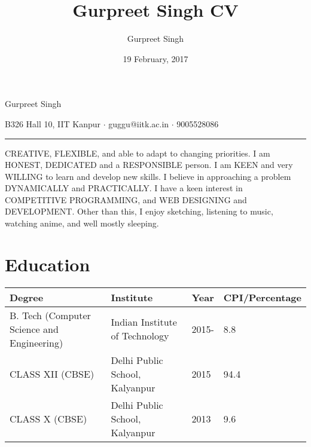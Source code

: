 \documentclass[a4paper, 10pt]{article}
\title{Gurpreet Singh CV}
\author{Gurpreet Singh}
\date{19 February, 2017}
\begin{document}

\begin{center}
    {\huge Gurpreet Singh} \\
    \vspace{5mm}
    
    B326 Hall 10, IIT Kanpur $ \cdot $ guggu@iitk.ac.in $ \cdot $ 9005528086

	\rule{\paperwidth}{0.4pt}

\end{center}

CREATIVE, FLEXIBLE, and able to adapt to changing priorities. I am HONEST, DEDICATED and a RESPONSIBLE person. I am KEEN and very WILLING to learn and develop new skills. I believe in approaching a problem DYNAMICALLY and PRACTICALLY. I have a keen interest in COMPETITIVE PROGRAMMING, and WEB DESIGNING and DEVELOPMENT. Other than this, I enjoy sketching, listening to music, watching anime, and well mostly sleeping.

\section*{Education}

	\begin{center}
	
		{\renewcommand{\arraystretch}{1.4}
		
		\begin{tabular}{ p{5cm}|p{5cm}|p{2cm}|p{3.5cm} }
		
		\hline
		\textbf{Degree} & \textbf{Institute} & \textbf{Year} & \textbf{CPI/Percentage} \\
		
		\hline
		B. Tech \newline (Computer Science and Engineering) & Indian Institute of Technology & 2015- & 8.8 \\
		
		\hline
		CLASS XII \newline (CBSE) & Delhi Public School, Kalyanpur & 2015 & 94.4 \\
		
		\hline
		CLASS X \newline (CBSE) & Delhi Public School, Kalyanpur & 2013 & 9.6 \\		
		\end{tabular}
		}
	
	\end{center}
\end{document}
